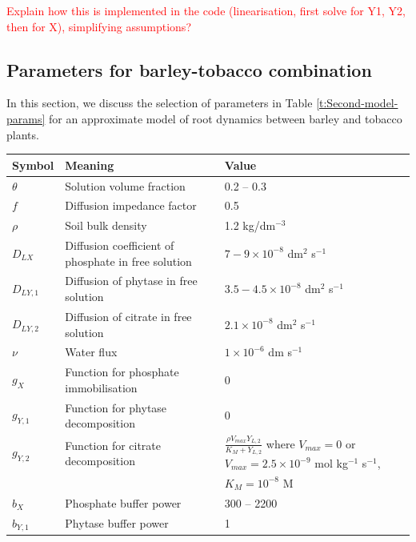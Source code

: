 \documentclass[11pt]{article}
\begin{document}
\textcolor{red}{Explain how this is implemented in the code (linearisation, first solve for Y1, Y2, then for X), simplifying assumptions?}


\subsection{Parameters for barley-tobacco combination}
In this section, we discuss the selection of parameters in Table \ref{t:Second-model-params} for an approximate model of root dynamics between barley and tobacco plants.

\begin{table}[!htb]
\begin{center}
\fontsize{9.5}{7}\selectfont
\setlength{\tabcolsep}{5.pt}
\def\arraystretch{2.0}
\begin{tabular}{lll}
\toprule
    \bf Symbol & \multicolumn{1}{l}{\bf Meaning} & \bf Value
    \\ \midrule
    $\theta$ & Solution volume fraction & 0.2 -- 0.3 \\
    $f$ & Diffusion impedance factor & 0.5 \\ 
    $\rho$ & Soil bulk density & 1.2 kg/dm$^{-3}$ \\
    $D_{LX} $ & Diffusion coefficient of phosphate in free solution & $7-9 \times 10^{-8}$ dm$^2$ s$^{-1}$ \\  
	$D_{LY,1}$ &  Diffusion of phytase in free solution & $3.5 - 4.5 \times 10^{-8}$ dm$^2$ s$^{-1}$ \\   
	$D_{LY,2}$ & Diffusion of citrate in free solution & $2.1 \times 10^{-8}$ dm$^2$ s$^{-1}$ \\
	$\nu$ & Water flux & $1 \times 10^{-6}$ dm s$^{-1}$\\
	$g_X$ & Function for phosphate immobilisation & 0 \\
	$g_{Y,1}$ & Function for phytase decomposition & 0 \\
	$g_{Y,2}$ & Function for citrate decomposition & $\frac{\rho V_{max} Y_{L,2} }{K_M + Y_{L,2} }$ where $V_{max} = 0$ or $V_{max} = 2.5 \times 10^{-9}$ mol kg$^{-1}$ s$^{-1}$, \\
	 & & $K_M=10^{-8}$ M \\
	$b_X$ & Phosphate buffer power & 300 -- 2200 \\
	$b_{Y,1}$ & Phytase buffer power & 1 \\

\end{tabular}
\end{center}
\end{table}
\end{document}
